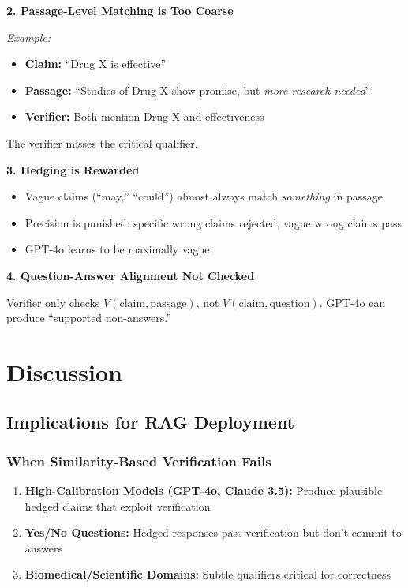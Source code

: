 \documentclass[11pt]{article}
\begin{document}
\textbf{2. Passage-Level Matching is Too Coarse}

\textit{Example:}
\begin{itemize}
\item \textbf{Claim:} ``Drug X is effective''
\item \textbf{Passage:} ``Studies of Drug X show promise, but \textit{more research needed}''
\item \textbf{Verifier:} \checkmark Both mention Drug X and effectiveness
\end{itemize}

The verifier misses the critical qualifier.

\textbf{3. Hedging is Rewarded}

\begin{itemize}
\item Vague claims (``may,'' ``could'') almost always match \textit{something} in passage
\item Precision is punished: specific wrong claims rejected, vague wrong claims pass
\item GPT-4o learns to be maximally vague
\end{itemize}

\textbf{4. Question-Answer Alignment Not Checked}

Verifier only checks $V(\text{claim}, \text{passage})$, not $V(\text{claim}, \text{question})$. GPT-4o can produce ``supported non-answers.''

\section{Discussion}

\subsection{Implications for RAG Deployment}

\subsubsection{When Similarity-Based Verification Fails}

\begin{enumerate}
\item \textbf{High-Calibration Models (GPT-4o, Claude 3.5):} Produce plausible hedged claims that exploit verification
\item \textbf{Yes/No Questions:} Hedged responses pass verification but don't commit to answers
\item \textbf{Biomedical/Scientific Domains:} Subtle qualifiers critical for correctness
\end{enumerate}
\end{document}
